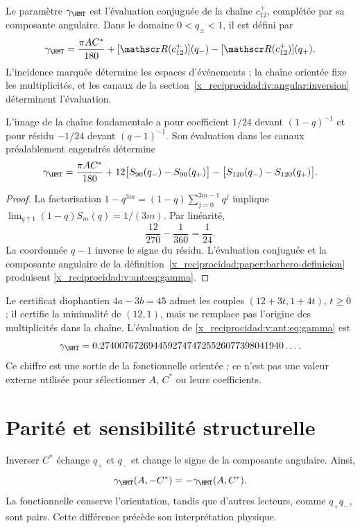 \begin{definition}
\label{x_reciprocidad:paper:barbero-definicion}
Le paramètre \(\gamma_{\HMT}\) est l’évaluation conjuguée de la chaîne
\(c_{12}^{+}\), complétée par sa composante angulaire. Dans le domaine
\(0<q_\pm<1\), il est défini par
\[
\gamma_{\HMT}=\frac{\pi AC^*}{180}
+[\mathscr R(c_{12}^{+})](q_-)-[\mathscr R(c_{12}^{+})](q_+).
\]
L'incidence marquée détermine les espaces d'événements ; la chaîne orientée fixe les multiplicités, et les canaux de la section~\ref{x_reciprocidad:iv:angular:inversion} déterminent l'évaluation.
\end{definition}

\begin{theorem}
L'image de la chaîne fondamentale a pour coefficient $1/24$
devant $(1-q)^{-1}$ et pour résidu $-1/24$ devant $(q-1)^{-1}$.
Son évaluation dans les canaux préalablement engendrés détermine
\begin{equation}
\gamma_{\HMT}=
\frac{\pi AC^*}{180}
+12\bigl[S_{90}(q_-)-S_{90}(q_+)\bigr]
-\bigl[S_{120}(q_-)-S_{120}(q_+)\bigr].
\label{x_reciprocidad:v:ant:eq:gamma}
\end{equation}
\end{theorem}
\begin{proof}
La factorisation $1-q^{3m}=(1-q)\sum_{j=0}^{3m-1}q^j$ implique
$\lim_{q\uparrow1}(1-q)S_m(q)=1/(3m)$. Par linéarité,
\[
\frac{12}{270}-\frac1{360}=\frac1{24}.
\]
La coordonnée $q-1$ inverse le signe du résidu.
L’évaluation conjuguée et la composante angulaire de la définition~\ref{x_reciprocidad:paper:barbero-definicion}
produisent \eqref{x_reciprocidad:v:ant:eq:gamma}.
\end{proof}

Le certificat diophantien $4a-3b=45$ admet les couples
$(12+3t,1+4t)$, $t\ge0$ ; il certifie la minimalité de $(12,1)$,
mais ne remplace pas l'origine des multiplicités dans la chaîne.
L'évaluation de \eqref{x_reciprocidad:v:ant:eq:gamma} est
\[
\gamma_{\HMT}
=0.27400767269445927474725526077398041940\ldots.
\]
Ce chiffre est une sortie de la fonctionnelle orientée ; ce n’est pas une valeur externe
utilisée pour sélectionner $A$, $C^*$ ou leurs coefficients.

\section{Parité et sensibilité structurelle}
Inverser $C^*$ échange $q_+$ et $q_-$ et change le signe
de la composante angulaire. Ainsi,
\[
\gamma_{\HMT}(A,-C^*)=-\gamma_{\HMT}(A,C^*).
\]
La fonctionnelle conserve l'orientation, tandis que d'autres lecteurs,
comme $q_+q_-$, sont pairs. Cette différence précède son interprétation physique.

